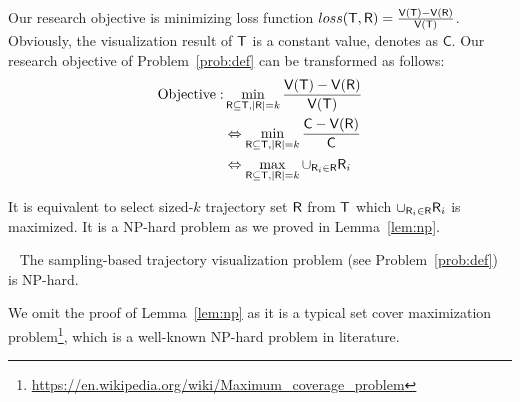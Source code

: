 Our research objective is minimizing loss function $loss(\mathsf{T}, \mathsf{R}) =  \frac{\mathsf{V}(\mathsf{T}) - \mathsf{V}(\mathsf{R})}{\mathsf{V}(\mathsf{T})}$.
Obviously, the visualization result of $\mathsf{T}$ is a constant value, denotes as $\mathsf{C}$.
Our research objective of Problem~\ref{prob:def} can be transformed as follows:
\begin{align}\label{eqn:obj2} \nonumber
\text{Objective}: & \min_{\mathsf{R} \subseteq \mathsf{T}, |\mathsf{R}| = k}  \frac{\mathsf{V}(\mathsf{T}) - \mathsf{V}(\mathsf{R})}{\mathsf{V}(\mathsf{T})} \\ \nonumber
& \Leftrightarrow \min_{\mathsf{R} \subseteq \mathsf{T}, |\mathsf{R}| = k}  \frac{\mathsf{C} - \mathsf{V}(\mathsf{R})}{\mathsf{C}} \\ \nonumber
& \Leftrightarrow \max_{\mathsf{R} \subseteq \mathsf{T}, |\mathsf{R}| = k}  \cup_{\mathsf{R}_i \in \mathsf{R}} \mathsf{R}_i
\end{align}

It is equivalent to select sized-$k$ trajectory set $\mathsf{R}$ from $\mathsf{T}$ which $\cup_{\mathsf{R}_i \in \mathsf{R}} \mathsf{R}_i$ is maximized.
It is a NP-hard problem as we proved in Lemma~\ref{lem:np}.

\begin{lemma}[NP hard]~\label{lem:np}
The sampling-based trajectory visualization problem (see Problem~\ref{prob:def}) is NP-hard.
\end{lemma}

We omit the proof of Lemma~\ref{lem:np} as it is a typical set cover maximization problem\footnote{\url{https://en.wikipedia.org/wiki/Maximum_coverage_problem}}, which is a well-known NP-hard problem in literature.

